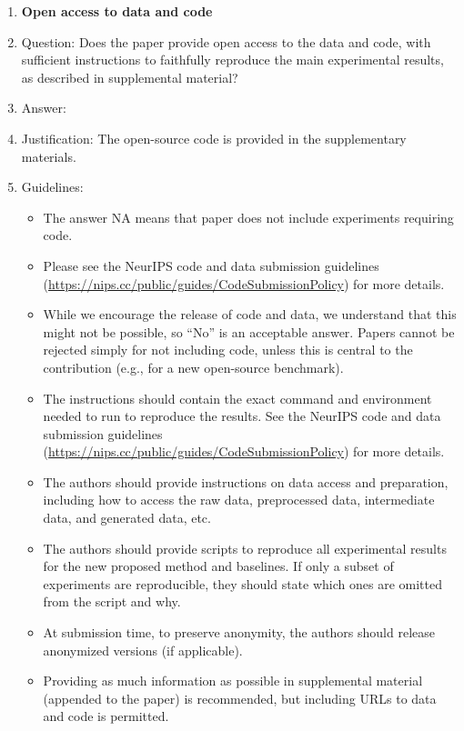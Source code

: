 \documentclass{article}
\begin{document}
{\begin{enumerate}
\item {\bf Open access to data and code}
    \item[] Question: Does the paper provide open access to the data and code, with sufficient instructions to faithfully reproduce the main experimental results, as described in supplemental material?
    \item[] Answer: \answerYes{} %
    \item[] Justification: The open-source code is provided in the supplementary materials.
    \item[] Guidelines:
    \begin{itemize}
        \item The answer NA means that paper does not include experiments requiring code.
        \item Please see the NeurIPS code and data submission guidelines (\url{https://nips.cc/public/guides/CodeSubmissionPolicy}) for more details.
        \item While we encourage the release of code and data, we understand that this might not be possible, so “No” is an acceptable answer. Papers cannot be rejected simply for not including code, unless this is central to the contribution (e.g., for a new open-source benchmark).
        \item The instructions should contain the exact command and environment needed to run to reproduce the results. See the NeurIPS code and data submission guidelines (\url{https://nips.cc/public/guides/CodeSubmissionPolicy}) for more details.
        \item The authors should provide instructions on data access and preparation, including how to access the raw data, preprocessed data, intermediate data, and generated data, etc.
        \item The authors should provide scripts to reproduce all experimental results for the new proposed method and baselines. If only a subset of experiments are reproducible, they should state which ones are omitted from the script and why.
        \item At submission time, to preserve anonymity, the authors should release anonymized versions (if applicable).
        \item Providing as much information as possible in supplemental material (appended to the paper) is recommended, but including URLs to data and code is permitted.
    \end{itemize}



\end{enumerate}}
\end{document}
